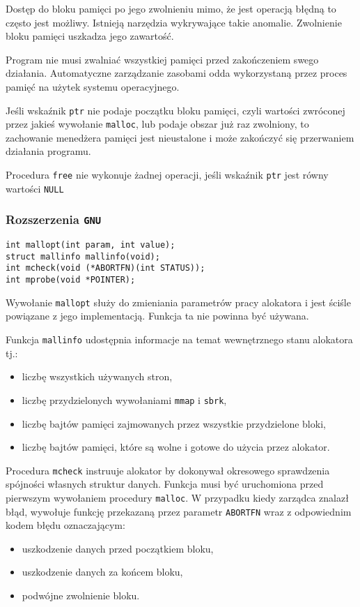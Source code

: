 \documentclass[12pt,a4paper,titlepage,twoside]{mwart}
\begin{document}
Dostęp do bloku pamięci po jego zwolnieniu mimo, że jest operacją błędną to
często jest możliwy. Istnieją narzędzia wykrywające takie anomalie. Zwolnienie
bloku pamięci uszkadza jego zawartość.

Program nie musi zwalniać wszystkiej pamięci przed zakończeniem swego
działania. Automatyczne zarządzanie zasobami odda wykorzystaną przez proces
pamięć na użytek systemu operacyjnego.

Jeśli wskaźnik \texttt{ptr} nie podaje początku bloku pamięci, czyli wartości
zwróconej przez jakieś wywołanie \texttt{malloc}, lub podaje obszar już raz
zwolniony, to zachowanie menedżera pamięci jest nieustalone i może
zakończyć się przerwaniem działania programu.

Procedura \texttt{free} nie wykonuje żadnej operacji, jeśli wskaźnik
\texttt{ptr} jest równy wartości \texttt{NULL}

\subsubsection{Rozszerzenia \texttt{GNU}}

\vspace{2ex}
\begin{lstlisting}[caption={Prototypy pozostałych procedur i zmiennych.}]
int mallopt(int param, int value);
struct mallinfo mallinfo(void);
int mcheck(void (*ABORTFN)(int STATUS));
int mprobe(void *POINTER);
\end{lstlisting}

Wywołanie \texttt{mallopt} służy do zmieniania parametrów pracy alokatora i
jest ściśle powiązane z jego implementacją. Funkcja ta nie powinna być używana.

Funkcja \texttt{mallinfo} udostępnia informacje na temat wewnętrznego stanu
alokatora tj.: 
\begin{itemize}
\item liczbę wszystkich używanych stron,
\item liczbę przydzielonych wywołaniami \texttt{mmap} i \texttt{sbrk},
\item liczbę bajtów pamięci zajmowanych przez wszystkie przydzielone bloki,
\item liczbę bajtów pamięci, które są wolne i gotowe do użycia przez alokator.
\end{itemize}

Procedura \texttt{mcheck} instruuje alokator by dokonywał okresowego
sprawdzenia spójności własnych struktur danych. Funkcja musi być uruchomiona
przed pierwszym wywołaniem procedury \texttt{malloc}. W przypadku kiedy
zarządca znalazł błąd, wywołuje funkcję przekazaną przez parametr
\texttt{ABORTFN} wraz z odpowiednim kodem błędu oznaczającym:
\begin{itemize}
\item uszkodzenie danych przed początkiem bloku,
\item uszkodzenie danych za końcem bloku,
\item podwójne zwolnienie bloku.
\end{itemize}
\end{document}
